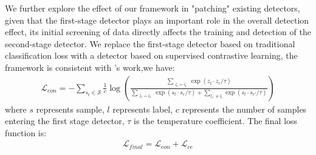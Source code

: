 \documentclass[11pt]{article}
\newcommand{\greenCite}[1]{\textcolor{darkgreen}{\cite{#1}}}
\begin{document}
			\begin{table}[ht]
				\centering
				\caption{Performance results of "patching" results.}
				\label{tab:patch_results}
				\end{table}
				We further explore the effect of our framework in "patching" existing detectors, given that the first-stage detector plays an important role in the overall detection effect, its initial screening of data directly affects the training and detection of the second-stage detector. We replace the first-stage detector based on traditional classification loss with a detector based on supervised contrastive learning, the framework is consistent with \greenCite{Chen2022contastive}'s work,we have:
				\begin{equation}
					\label{ineq:newfirst_function}
					\begin{aligned}
						\mathcal{L}_{con} = -\sum_{s_t \in \mathcal{S}} \frac{1}{c} \log \left( 
							\frac{
									\sum\limits_{\substack{l_r=l_t}} \exp(z_t \cdot z_r / \tau)
							}{
									\sum\limits_{\substack{l_r=l_t}} \exp(s_t \cdot s_r / \tau) + \sum\limits_{l_{r'} \neq l_t} \exp(s_t \cdot s_{r'} / \tau)
							} \right)
					\end{aligned}
					\end{equation}
				where $s$ represents sample, $l$ represents label, $c$ represents the number of samples entering the first stage detector, $\tau$ is the temperature coefficient.
				The final loss function is:
				\begin{equation}
					\label{eq:newfirst_final}
					\begin{aligned}
						\mathcal{L}_{final} = \mathcal{L}_{con} + \mathcal{L}_{ce}
					\end{aligned}
				\end{equation}
\end{document}
